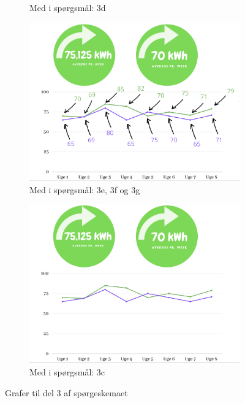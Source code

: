 \begin{figure}[H]
\begin{subfigure}[b]{0.45\textwidth}
        \caption[Graf 2 til spørgeskema del 3]{Med i spørgsmål: 3d}
    \end{subfigure}
    \hfill
    \begin{subfigure}[b]{0.45\textwidth}
        \centering
        \includegraphics[width=\textwidth]{Images/appendixA/num_wheel.png}
        \caption[Graf 3 til spørgeskema del 3]{Med i spørgsmål: 3e, 3f og 3g}
    \end{subfigure}
    \hfill
    \begin{subfigure}[b]{0.45\textwidth}
        \centering
        \includegraphics[width=\textwidth]{Images/appendixA/wheel.png}
        \caption[Graf 4 til spørgeskema del 3]{Med i spørgsmål: 3c}
    \end{subfigure}
    \caption{Grafer til del 3 af spørgeskemaet}
    \label{fig:survey:graphs1}
\end{figure}
